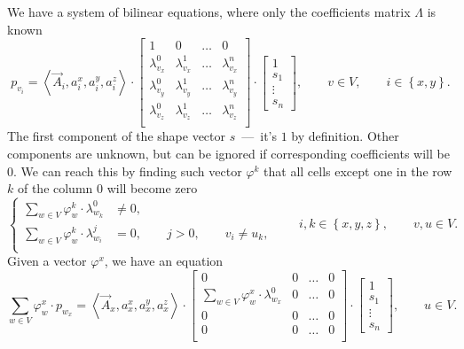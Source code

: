 We have a system of bilinear equations,
where only the coefficients matrix $\Lambda$ is known
\begin{equation}\label{eq:bilinear:matrix}
  p_{v_i}
  = \left\langle \vec{A}_i, a_i^x, a_i^y, a_i^z \right\rangle
    \cdot \begin{bmatrix}
      1               & 0               & \dots & 0 \\
      \lambda^0_{v_x} & \lambda^1_{v_x} & \dots & \lambda^n_{v_x} \\
      \lambda^0_{v_y} & \lambda^1_{v_y} & \dots & \lambda^n_{v_y} \\
      \lambda^0_{v_z} & \lambda^1_{v_z} & \dots & \lambda^n_{v_z} \\
    \end{bmatrix}
    \cdot \begin{bmatrix}
      1 \\
      s_1 \\
      \vdots \\
      s_n
    \end{bmatrix},
  \qquad v \in V,
  \qquad i \in \left\{ x, y \right\}.
\end{equation}
The first component of the shape vector $s$~---~it's $1$ by definition.
Other components are unknown,
but can be ignored if corresponding coefficients will be $0$.
We can reach this by finding such vector $\varphi^k$
that all cells except one in the row $k$ of the column $0$ will become zero
\begin{equation*}
  \begin{cases}
    \sum\limits_{w \in V} \varphi_w^k \cdot \lambda_{w_k}^0 &\neq 0, \\
    \sum\limits_{w \in V} \varphi_w^k \cdot \lambda_{w_i}^j &= 0,
      \qquad j > 0,
      \qquad v_i \neq u_k, \\
  \end{cases}
  \qquad i, k \in \left\{ x, y, z \right\},
  \qquad v, u \in V.
\end{equation*}
Given a vector $\varphi^x$, we have an equation
\begin{equation*}
  \sum\limits_{w \in V} \varphi_w^x \cdot p_{w_x}
  = \left\langle \vec{A}_x, a_x^x, a_x^y, a_x^z \right\rangle
    \cdot \begin{bmatrix}
      0                                     & 0 & \dots & 0 \\
      \sum\limits_{w \in V} \varphi_w^x
        \cdot \lambda^0_{w_x} & 0 & \dots   & 0 \\
      0                                     & 0 & \dots & 0 \\
      0                                     & 0 & \dots & 0 \\
    \end{bmatrix}
    \cdot \begin{bmatrix}
      1 \\
      s_1 \\
      \vdots \\
      s_n
    \end{bmatrix},
  \qquad u \in V.
\end{equation*}

